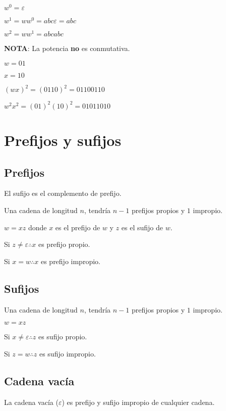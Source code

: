 \documentclass{article}
\begin{document}
$w^0 = \varepsilon$

$w^1 = ww^0= abc \varepsilon = abc$

$w^2 = ww^1 = abcabc$
\vspace{1em}

\textbf{NOTA}: La potencia \textbf{no} es conmutativa.
\vspace{1em}

$w = 01$

$x = 10$
\vspace{1em}

$(wx)^2 = (0110)^2 = 01100110$

$w^2x^2 = (01)^2(10)^2= 01011010$

\section{Prefijos y sufijos}

\subsection{Prefijos}

El sufijo es el complemento de prefijo.

Una cadena de longitud $n$, tendría $n-1$ prefijos propios y $1$ impropio.
\vspace{1em}

$w = xz$ donde $x$ es el prefijo de $w$ y $z$ es el sufijo de $w$.

Si $z \ne \varepsilon \therefore x$ es prefijo propio.

Si $x = w \therefore x$ es prefijo impropio.

\subsection{Sufijos}

Una cadena de longitud $n$, tendría $n-1$ prefijos propios y $1$ impropio.
\vspace{1em}

$w = xz$

Si $x \ne \varepsilon \therefore z$ es sufijo propio.

Si $z = w \therefore z$ es sufijo impropio.

\subsection{Cadena vacía}

La cadena vacía ($\varepsilon$) es prefijo y sufijo impropio de cualquier cadena.
\end{document}
